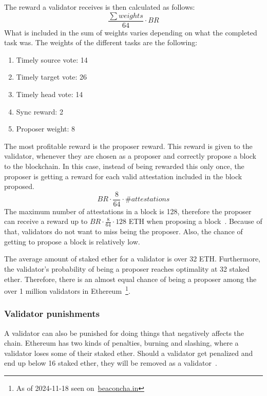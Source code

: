 The reward a validator receives is then calculated as follows:
\begin{equation}
    \frac{\sum{weights}}{64}\cdot BR
    \label{eq:valrewards}
\end{equation}
What is included in the sum of weights varies depending on what the completed task was.
The weights of the different tasks are the following:
\begin{enumerate}
    \item Timely source vote: 14
    \item Timely target vote: 26
    \item Timely head vote: 14
    \item Sync reward: 2
    \item Proposer weight: 8
\end{enumerate}
The most profitable reward is the proposer reward.
This reward is given to the validator, whenever they are chosen as a proposer and correctly propose a block to the blockchain.
In this case, instead of being rewarded this only once,
the proposer is getting a reward for each valid attestation included in the block proposed.
\begin{equation}
    BR\cdot\frac{8}{64}\cdot \#attestations\label
    {eq:propreward}
\end{equation}
The maximum number of attestations in a block is 128, therefore the proposer can receive a reward up to $BR\cdot\frac{8}{64}\cdot128$ ETH when proposing a block~\cite{PoSRewAndPen,consensus-spec-phase-0}.
Because of that, validators do not want to miss being the proposer.
Also, the chance of getting to propose a block is relatively low.

The average amount of staked ether for a validator is over 32 ETH\@.
Furthermore, the validator's probability of being a proposer reaches optimality at 32 staked ether.
Therefore, there is an almost equal chance of being a proposer among the over 1 million validators in Ethereum~\footnote{As of 2024-11-18 seen on~\href{https://beaconcha.in/}{beaconcha.in}}.

\subsubsection{Validator punishments}\label{subsubsec:valpunish}
A validator can also be punished for doing things that negatively affects the chain.
Ethereum has two kinds of penalties, burning and slashing, where a validator loses some of their staked ether.
Should a validator get penalized and end up below 16 staked ether, they will be removed as a validator~\cite{consensus-spec-phase-0}.


